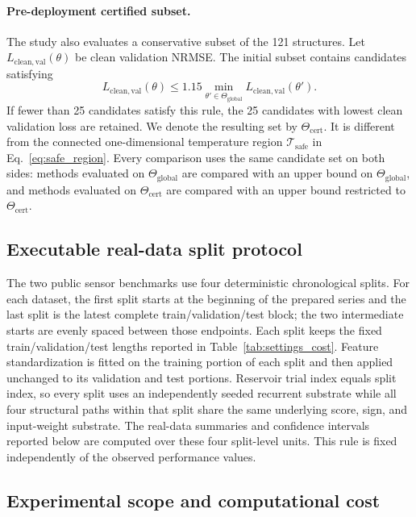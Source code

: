 \documentclass[11pt,a4paper]{article}
\begin{document}
\paragraph{Pre-deployment certified subset.}
The study also evaluates a conservative subset of the 121 structures. Let $L_{\mathrm{clean,val}}(\theta)$ be clean validation NRMSE. The initial subset contains candidates satisfying
\begin{equation}
  L_{\mathrm{clean,val}}(\theta)
  \le 1.15\min_{\theta'\in\Theta_{\mathrm{global}}}
  L_{\mathrm{clean,val}}(\theta').
\end{equation}
If fewer than 25 candidates satisfy this rule, the 25 candidates with lowest clean validation loss are retained. We denote the resulting set by $\Theta_{\mathrm{cert}}$. It is different from the connected one-dimensional temperature region $\mathcal T_{\mathrm{safe}}$ in Eq.~\eqref{eq:safe_region}. Every comparison uses the same candidate set on both sides: methods evaluated on $\Theta_{\mathrm{global}}$ are compared with an upper bound on $\Theta_{\mathrm{global}}$, and methods evaluated on $\Theta_{\mathrm{cert}}$ are compared with an upper bound restricted to $\Theta_{\mathrm{cert}}$.

\subsection{Executable real-data split protocol}
\label{sec:realdata_protocol}

The two public sensor benchmarks use four deterministic chronological splits. For each dataset, the first split starts at the beginning of the prepared series and the last split is the latest complete train/validation/test block; the two intermediate starts are evenly spaced between those endpoints. Each split keeps the fixed train/validation/test lengths reported in Table~\ref{tab:settings_cost}. Feature standardization is fitted on the training portion of each split and then applied unchanged to its validation and test portions. Reservoir trial index equals split index, so every split uses an independently seeded recurrent substrate while all four structural paths within that split share the same underlying score, sign, and input-weight substrate. The real-data summaries and confidence intervals reported below are computed over these four split-level units. This rule is fixed independently of the observed performance values.

\subsection{Experimental scope and computational cost}
\label{sec:scope_cost}
\end{document}
